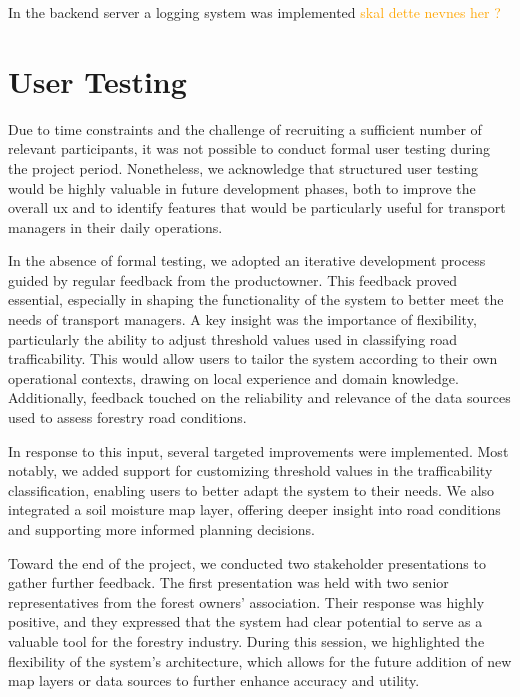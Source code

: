 In the backend server a logging system was implemented \textcolor{orange}{skal dette nevnes her ?}

\section{User Testing}\label{sec:quality_assurance_user_feedback:user_testing}

Due to time constraints and the challenge of recruiting a sufficient number of relevant participants, it was not possible to conduct formal user testing during the project period. Nonetheless, we acknowledge that structured user testing would be highly valuable in future development phases, both to improve the overall \acrfull{ux} and to identify features that would be particularly useful for transport managers in their daily operations.

In the absence of formal testing, we adopted an iterative development process guided by regular feedback from the \gls{productowner}. This feedback proved essential, especially in shaping the functionality of the system to better meet the needs of transport managers. A key insight was the importance of flexibility, particularly the ability to adjust threshold values used in classifying road trafficability. This would allow users to tailor the system according to their own operational contexts, drawing on local experience and domain knowledge. Additionally, feedback touched on the reliability and relevance of the data sources used to assess forestry road conditions.

In response to this input, several targeted improvements were implemented. Most notably, we added support for customizing threshold values in the trafficability classification, enabling users to better adapt the system to their needs. We also integrated a soil moisture map layer, offering deeper insight into road conditions and supporting more informed planning decisions.

Toward the end of the project, we conducted two stakeholder presentations to gather further feedback. The first presentation was held with two senior representatives from the forest owners' association. Their response was highly positive, and they expressed that the system had clear potential to serve as a valuable tool for the forestry industry. During this session, we highlighted the flexibility of the system's architecture, which allows for the future addition of new map layers or data sources to further enhance accuracy and utility.


